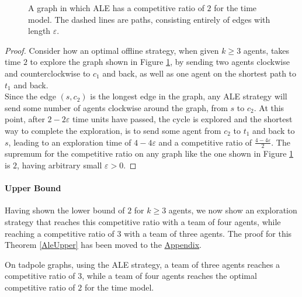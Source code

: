 \begin{figure}[H]
    \begin{center}
    \end{center}
    \caption[ALE is not $1.5$-competitive]{A graph in which ALE has a competitive ratio of $2$ for the time model. The dashed lines
    are paths, consisting entirely of edges with length $\varepsilon$.}
    \label{ALETad}
\end{figure}

\begin{proof}
    Consider how an optimal offline strategy, when given $k\geq3$ agents, takes time $2$ to explore the graph shown in Figure \ref{ALETad}, by sending two
    agents clockwise and counterclockwise to $c_1$ and back, as well as one agent on the shortest path to $t_1$ and back.\\
    Since the edge $(s,c_2)$ is the longest edge in the graph, any ALE strategy will send some number of agents clockwise around the graph, from
    $s$ to $c_2$. At this point, after $2-2\varepsilon$ time units have passed, the cycle is explored and the shortest way to complete the exploration, is to send
    some agent from $c_2$ to $t_1$ and back to $s$, leading to an exploration time of $4-4\varepsilon$ and a competitive ratio of $\frac{4-4\varepsilon}{2}$.
    The supremum for the competitive ratio on any graph like the one shown in Figure \ref*{ALETad} is $2$, having arbitrary small $\varepsilon>0$.
\end{proof}

\paragraph*{Upper Bound}

Having shown the lower bound of $2$ for $k\geq 3$ agents, we now show an exploration strategy that reaches this competitive ratio with a team of four agents,
while reaching a competitive ratio of $3$ with a team of three agents. The proof for this Theorem \ref{AleUpper} has been moved to the \hyperref[appendix]{Appendix}.


\begin{theorem}\label{AleUpper}
    On tadpole graphs, using the ALE strategy, a team of three agents reaches a competitive ratio of $3$,
     while a team of four agents reaches the optimal competitive ratio of $2$ for the time model.
\end{theorem}

